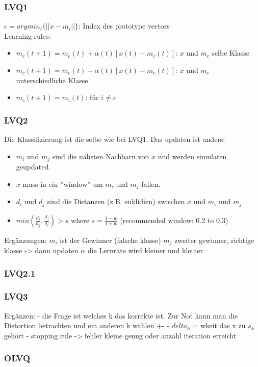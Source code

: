 \subsubsection{LVQ1}
\label{sssect:vq-lvq1}
$c = argmin_i\{||x - m_i||\}$: Index des prototype vectors\\
Learning rules:
\begin{itemize}
	\item $m_c(t + 1) = m_c(t) + \alpha(t)[x(t) - m_c(t)]$: $x$ und $m_c$ selbe Klasse
	\item $m_c(t + 1) = m_c(t) - \alpha(t)[x(t) - m_c(t)]$: $x$ und $m_c$ unterschiedliche Klasse
	\item $m_c(t + 1) = m_i(t)$: für $i \neq c$
\end{itemize}

\subsubsection{LVQ2}
\label{sssect:vq-lvq2}
Die Klassifizierung ist die selbe wie bei LVQ1. Das updaten ist anders:
\begin{itemize}
	\item $m_i$ und $m_j$ sind die nähsten Nachbarn von $x$ und werden simulaten geupdated.
	\item $x$ muss in ein ''window'' um $m_i$ und $m_j$ fallen.
	\item $d_i$ und $d_j$ sind die Distanzen (z.B. euklidien) zwischen $x$ und $m_i$ und $m_j$
	\item $min \left(\frac{d_i}{d_j}, \frac{d_j}{d_i}\right) > s$ where $s = \frac{1 - w}{1 + w}$ (recommended window: 0.2 to 0.3)
\end{itemize}


Ergänzungen:
$m_i$ ist der Gewinner (falsche klasse)
$m_j$ zweiter gewinner, richtige klasse -> dann updaten
$\alpha$ die Lernrate wird kleiner und kleiner

\subsubsection{LVQ2.1}
\label{sssect:vq-lvq2.1}


\subsubsection{LVQ3}
\label{sssect:vq-lvq3}



Ergänzen:
- die Frage ist welches k das korrekte ist. Zur Not kann man die Distortion betrachten und ein anderen k wählen +-
- $delta_k$ = wkeit das x zu $s_k$ gehört
- stopping rule -> fehler kleine genug oder anzahl iteration erreicht
\subsubsection{OLVQ}
\label{sssect:vq-olvq}

\newpage